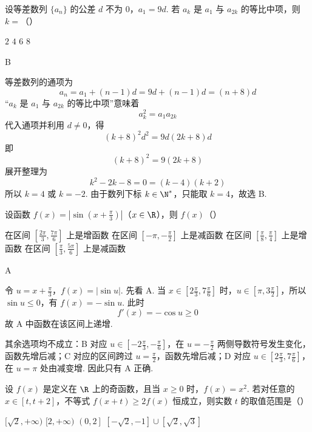 \begin{problem}
设等差数列 \(\{a_{n}\}\) 的公差 \(d\) 不为 \(0\)，\(a_{1} = 9d\). 若 \(a_{k}\) 是 \(a_{1}\) 与 \(a_{2k}\) 的等比中项，则 \(k =\)（\quad）

\choices
    {\(2\)}
    {\(4\)}
    {\(6\)}
    {\(8\)}
\end{problem}

\begin{answer}
B
\end{answer}

\begin{solution}
等差数列的通项为
\[
a_n=a_1+(n-1)d=9d+(n-1)d=(n+8)d
\]
“\(a_k\) 是 \(a_1\) 与 \(a_{2k}\) 的等比中项”意味着
\[
a_k^2=a_1a_{2k}
\]
代入通项并利用 \(d\ne0\)，得
\[
(k+8)^2d^2=9d(2k+8)d
\]
即
\[
(k+8)^2=9(2k+8)
\]
展开整理为
\[
k^2-2k-8=0=(k-4)(k+2)
\]
所以 \(k=4\) 或 \(k=-2\). 由于数列下标 \(k\in\N^*\)，只能取 \(k=4\)，故选 B.
\end{solution}

\begin{problem}
设函数 \(f(x) = \left|\sin \left(x + \frac{\pi}{3}\right)\right|\)（\(x \in \R\)），则 \(f(x)\)（\quad）

\choices
    {在区间 \(\left[\frac{2\pi}{3}, \frac{7\pi}{6}\right]\) 上是增函数}
    {在区间 \(\left[-\pi, -\frac{\pi}{2}\right]\) 上是减函数}
    {在区间 \(\left[\frac{\pi}{8}, \frac{\pi}{4}\right]\) 上是增函数}
    {在区间 \(\left[\frac{\pi}{3}, \frac{5\pi}{6}\right]\) 上是减函数}
\end{problem}

\begin{answer}
A
\end{answer}

\begin{solution}
令
\(u=x+\frac\pi3\)，\(f(x)=|\sin u|\).
先看 A. 当 \(x\in[2\frac{\pi}{3},7\frac{\pi}{6}]\) 时，\(u\in[\pi,3\frac{\pi}{2}]\)，所以 \(\sin u\leqslant0\)，有 \(f(x)=-\sin u\). 此时
\[
f'(x)=-\cos u\geqslant0
\]
故 A 中函数在该区间上递增.

其余选项均不成立：B 对应 \(u\in[-2\frac{\pi}{3},-\frac{\pi}{6}]\)，在 \(u=-\frac{\pi}{2}\) 两侧导数符号发生变化，函数先增后减；C 对应的区间跨过 \(u=\frac{\pi}{2}\)，函数先增后减；D 对应 \(u\in[2\frac{\pi}{3},7\frac{\pi}{6}]\)，在 \(u=\pi\) 处由减变增. 因此只有 A 正确.
\end{solution}

\begin{problem}
设 \( f(x) \) 是定义在 \( \R \) 上的奇函数，且当 \( x \geqslant 0 \) 时，\( f(x) = x^2 \). 若对任意的 \( x \in [t, t + 2] \)，不等式 \( f(x + t) \geqslant 2f(x) \) 恒成立，则实数 \( t \) 的取值范围是（\quad）

\choices
    {\([\sqrt{2}, +\infty)\)}
    {\([2, +\infty)\)}
    {\(\left(0,2\right]\)}
    {\(\left[-\sqrt{2}, -1\right] \cup \left[\sqrt{2}, \sqrt{3}\right]\)}
\end{problem}


